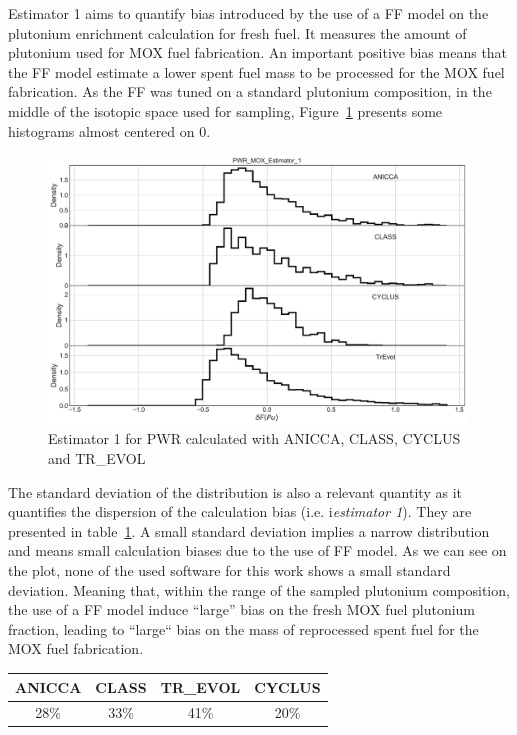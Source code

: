 Estimator 1 aims to quantify bias introduced by the use of a \gls{FF} model on
the plutonium enrichment calculation for fresh fuel. It measures the amount of
plutonium used for \gls{MOX} fuel fabrication. An important positive bias means
that the \gls{FF} model estimate a lower spent fuel mass to be processed for
the MOX fuel fabrication. As the \gls{FF} was tuned on a standard plutonium
composition, in the middle of the isotopic space used for sampling,
Figure~\ref{fig:Est1_PWR} presents some histograms almost centered on 0.
        

\begin{figure}[h]
	\begin{center}
		\includegraphics[width = 0.99\textwidth]{../../Feature_1/RAW_DATA/FIG/PWR_MOX_Estimator_1.pdf}
		\caption{Estimator 1 for \gls{PWR} calculated with ANICCA, CLASS, CYCLUS and TR\_EVOL}
		\label{fig:Est1_PWR}
	\end{center}
\end{figure}

The standard deviation of the distribution is also a relevant quantity as it
quantifies the dispersion of the calculation bias (i.e. i\textit{estimator 1}).
They are presented in table~\ref{table:Est1_PWR}. A small standard deviation
implies a narrow distribution and means small calculation biases due to the use
of \gls{FF} model. As we can see on the plot, none of the used software for this
work shows a small standard deviation. Meaning that, within the range of the
sampled plutonium composition, the use of a \gls{FF} model induce ``large'' bias
on the fresh \gls{MOX} fuel plutonium fraction, leading to ``large`` bias on the
mass of reprocessed spent fuel for the \gls{MOX} fuel fabrication.

\begin{table}[h]
	\begin{center}
		\begin{tabular}{|c||c||c||c|}
			\hline 
				ANICCA & CLASS & TR\_EVOL & CYCLUS \\
			\hline
				28\% & 33\% & 41\% & 20\% \\
			\hline
		\end{tabular}
	\end{center}
	\label{table:Est1_PWR}
\end{table}

